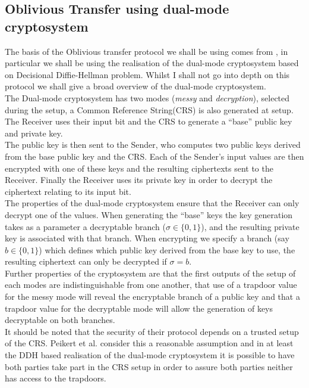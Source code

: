 \documentclass[a4paper,10pt]{article}
\begin{document}
		\subsection{Oblivious Transfer using dual-mode cryptosystem} \label{dualModeCryptoOT}
			The basis of the Oblivious transfer protocol we shall be using comes from \cite{PVW_OT_2008}, in particular we shall be using the realisation of the dual-mode cryptosystem based on Decisional Diffie-Hellman problem. Whilst I shall not go into depth on this protocol we shall give a broad overview of the dual-mode cryptosystem.\\

			The Dual-mode cryptosystem has two modes (\emph{messy} and \emph{decryption}), selected during the setup, a Common Reference String(CRS) is also generated at setup. The Receiver uses their input bit and the CRS to generate  a ``base'' public key and private key.\\

			The public key is then sent to the Sender, who computes two public keys derived from the base public key and the CRS. Each of the Sender's input values are then encrypted with one of these keys and the resulting ciphertexts sent to the Receiver. Finally the Receiver uses its private key in order to decrypt the ciphertext relating to its input bit.\\

			The properties of the dual-mode cryptosystem ensure that the Receiver can only decrypt one of the values. When generating the ``base'' keys the key generation takes as a parameter a decryptable branch ($\sigma \in \{0, 1\}$), and the resulting private key is associated with that branch. When encrypting we specify a branch (say $b \in \{0, 1\}$) which defines which public key derived from the base key to use, the resulting ciphertext can only be decrypted if $\sigma = b$.\\

 			Further properties of the cryptosystem are that the first outputs of the setup of each modes are indistinguishable from one another, that use of a trapdoor value for the messy mode will reveal the encryptable branch of a public key and that a trapdoor value for the decryptable mode will allow the generation of keys decryptable on both branches.\\

			It should be noted that the security of their protocol depends on a trusted setup of the CRS. Peikert et al. consider this a reasonable assumption and in at least the DDH based realisation of the dual-mode cryptosystem it is possible to have both parties take part in the CRS setup in order to assure both parties neither has access to the trapdoors.
\end{document}
